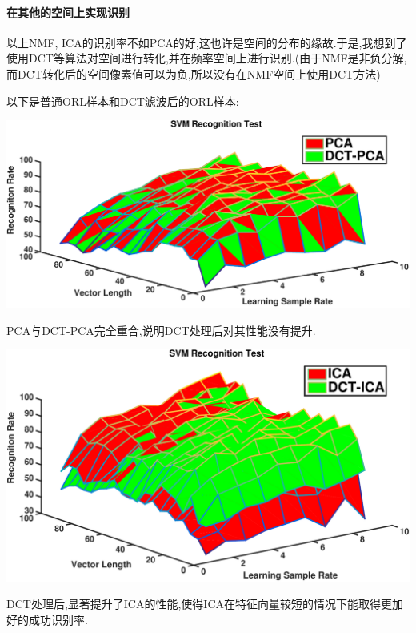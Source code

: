 	\paragraph{在其他的空间上实现识别} 以上NMF, ICA的识别率不如PCA的好,这也许是空间的分布的缘故.于是,我想到了使用DCT等算法对空间进行转化,并在频率空间上进行识别.(由于NMF是非负分解,而DCT转化后的空间像素值可以为负,所以没有在NMF空间上使用DCT方法) \newline
	
	以下是普通ORL样本和DCT滤波后的ORL样本:
	
	\begin{center}
	\begin{minipage}[t]{\linewidth}
	\center
	{
	\includegraphics[width=\textwidth]{Img/svm_pca_dct} 
	}
	\end{minipage}
	\medskip
	\end{center}
	PCA与DCT-PCA完全重合,说明DCT处理后对其性能没有提升.
	
	\begin{center}
	\begin{minipage}[t]{\linewidth}
	\center
	{
	\includegraphics[width=\textwidth]{Img/svm_ica_dct} 
	}
	\end{minipage}
	\medskip
	\end{center}
	DCT处理后,显著提升了ICA的性能,使得ICA在特征向量较短的情况下能取得更加好的成功识别率.
	
